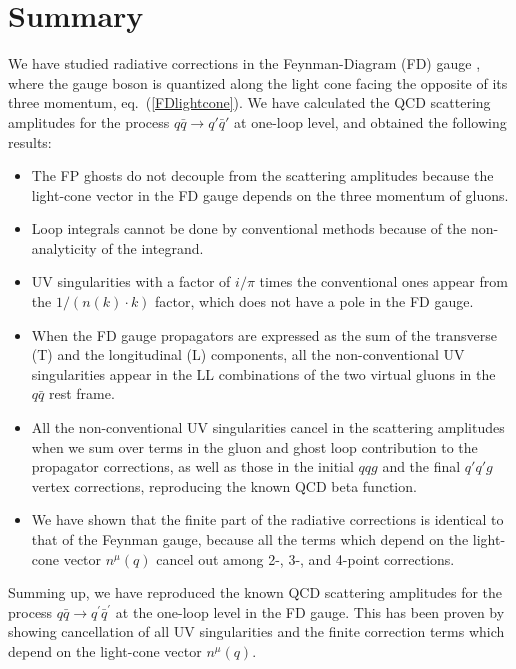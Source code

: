 \documentclass[preprint,amsmath,amssymb,superscriptaddress, floatfix,nofootinbib]{revtex4}
\begin{document}
\section{Summary}\label{sec:summary}
We have studied radiative corrections in the Feynman-Diagram (FD) 
gauge \cite{Hagiwara:2020tbx,Chen:2022gxv,Chen:2022xlg},
where the gauge boson is quantized along the light cone facing
the opposite of its three momentum, eq.~(\ref{FDlightcone}).
%
We have calculated the QCD scattering amplitudes for the process
$q\bar{q}\to q'\bar{q}'$ at one-loop level, and obtained the following
results:
%
\begin{itemize}
\item
The FP ghosts do not decouple from the scattering amplitudes
because the light-cone vector in the FD gauge depends on the
three momentum of gluons.
%
\item
Loop integrals cannot be done by conventional methods because
of the non-analyticity of the integrand. 
%
\item
UV singularities with a factor of $i/\pi$ times the conventional
ones appear from the $1/(n(k)\cdot k)$ factor, which does not
have a pole in the FD gauge. 
%
\item 
When the FD gauge propagators are expressed 
as the sum of the transverse (T) and 
the longitudinal (L) components, 
all the non-conventional UV singularities appear 
in the LL combinations of the two virtual gluons in the 
$q\bar{q}$ rest frame.
%
\item
All the non-conventional UV singularities cancel in the scattering
amplitudes when we sum over terms in the gluon and ghost loop
contribution to the propagator corrections, as well as those in the
initial $qqg$ and the final $q'q'g$ vertex corrections, reproducing
the known QCD beta function. 
%
\item
We have shown that the finite part of the radiative corrections is
identical to that of the Feynman gauge, because all the terms
which depend on the light-cone vector $n^{\mu}(q)$ cancel out
among 2-, 3-, and 4-point corrections. 
%
\end{itemize}

Summing up, we have reproduced the known QCD scattering amplitudes
for the process $q\bar{q} \to q^\prime\bar{q}^\prime$ at the one-loop level
in the FD gauge.
%
This has been proven by showing cancellation of all UV singularities
and the finite correction terms which depend on the light-cone
vector $n^{\mu}(q)$.
\end{document}
